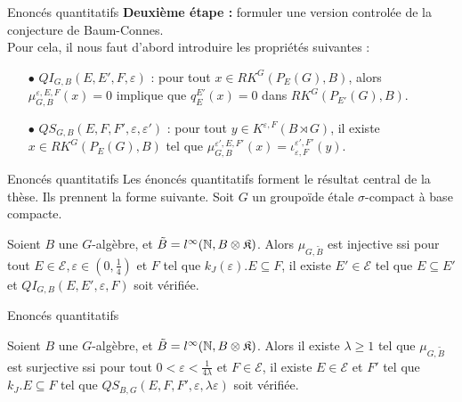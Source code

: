\begin{frame}{Enoncés quantitatifs}
\textbf{Deuxième étape :} formuler une version controlée de la conjecture de Baum-Connes.\\
\vspace{0.3 cm}
Pour cela, il nous faut d'abord introduire les propriétés suivantes :\\
\vspace{0.3 cm}
\begin{itemize}
\item[$\bullet$] $QI_{G,B}(E,E',F,\varepsilon)$ : pour tout $x\in RK^G(P_E(G), B )$, alors $\mu^{\varepsilon,E,F}_{G,B}(x) = 0$ implique que $q_E^{E'}(x)=0$ dans $RK^G(P_{E'}(G),B)$.
\vspace{0.3 cm}
\item[$\bullet$] $QS_{G,B}(E,F,F',\varepsilon,\varepsilon')$ : pour tout $y\in K^{\varepsilon,F}(B\rtimes G)$, il existe $x\in RK^G(P_E(G),B)$ tel que $\mu^{\varepsilon',E,F'}_{G,B}(x)=\iota_{\varepsilon,F}^{\varepsilon',F'}(y)$.\\
\end{itemize} 
\end{frame}

\begin{frame}{Enoncés quantitatifs}
Les énoncés quantitatifs forment le résultat central de la thèse. Ils prennent la forme suivante. Soit $G$ un groupoïde étale $\sigma$-compact à base compacte.\\
\vspace{0.3 cm}
\begin{thmfr}
Soient $B$ une $G$-algèbre, et $\tilde B = l^\infty(\mathbb N,B\otimes\mathfrak K)$. Alors $\mu_{G,\tilde B}$ est injective ssi pour tout $E\in\mathcal E,\varepsilon\in(0,\frac{1}{4})$ et $F$ tel que $k_J(\varepsilon).E\subseteq F$, il existe $E' \in\mathcal E$ tel que $E\subseteq E'$ et $QI_{G,B}(E,E',\varepsilon,F)$ soit vérifiée.
\end{thmfr}
\end{frame}

\begin{frame}{Enoncés quantitatifs}
\begin{thmfr}
Soient $B$ une $G$-algèbre, et $\tilde B = l^\infty(\mathbb N,B\otimes\mathfrak K)$. Alors il existe $\lambda \geq 1$ tel que $\mu_{G,\tilde B}$ est surjective ssi pour tout $0<\varepsilon<\frac{1}{4\lambda}$ et $F\in\mathcal E$, il existe $E\in\mathcal E$ et $F'$ tel que $k_J .E \subseteq F$ tel que $QS_{B,G}(E,F,F',\varepsilon,\lambda\varepsilon)$ soit vérifiée.
\end{thmfr}
\end{frame}

